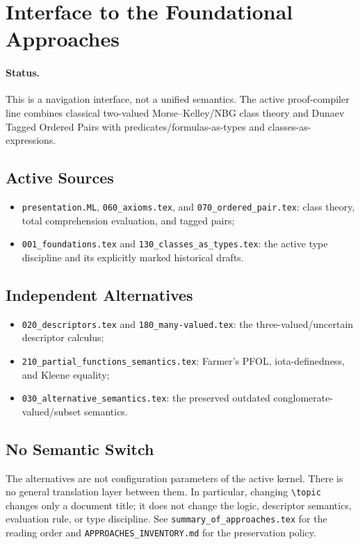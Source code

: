 \def\topic{Foundational Approach Interface}

\section{Interface to the Foundational Approaches}

\paragraph{Status.}
This is a navigation interface, not a unified semantics. The active
proof-compiler line combines classical two-valued Morse--Kelley/NBG class
theory and Dunaev Tagged Ordered Pairs with predicates/formulas-as-types and
classes-as-expressions.

\subsection{Active Sources}
\begin{itemize}
\item \texttt{presentation.ML}, \texttt{060\_axioms.tex}, and
  \texttt{070\_ordered\_pair.tex}: class theory, total comprehension
  evaluation, and tagged pairs;
\item \texttt{001\_foundations.tex} and \texttt{130\_classes\_as\_types.tex}:
  the active type discipline and its explicitly marked historical drafts.
\end{itemize}

\subsection{Independent Alternatives}
\begin{itemize}
\item \texttt{020\_descriptors.tex} and \texttt{180\_many-valued.tex}:
  the three-valued/uncertain descriptor calculus;
\item \texttt{210\_partial\_functions\_semantics.tex}: Farmer's PFOL,
  iota-definedness, and Kleene equality;
\item \texttt{030\_alternative\_semantics.tex}: the preserved outdated
  conglomerate-valued/subset semantics.
\end{itemize}

\subsection{No Semantic Switch}
The alternatives are not configuration parameters of the active kernel.
There is no general translation layer between them. In particular, changing
\verb|\topic| changes only a document title; it does not change the logic,
descriptor semantics, evaluation rule, or type discipline. See
\texttt{summary\_of\_approaches.tex} for the reading order and
\texttt{APPROACHES\_INVENTORY.md} for the preservation policy.


